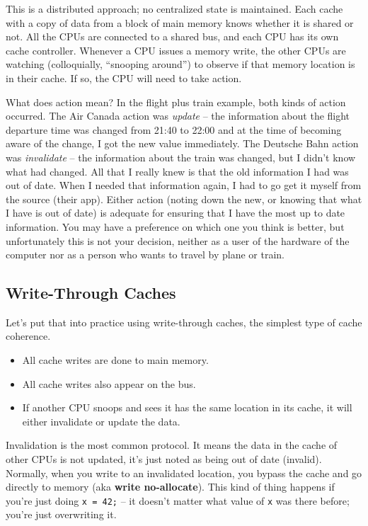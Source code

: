\documentclass[a4paper]{report}
\begin{document}
This is a distributed approach; no centralized state is maintained. Each cache with a copy of data from a block of main memory knows whether it is shared or not. All the CPUs are connected to a shared bus, and each CPU has its own cache controller. Whenever a CPU issues a memory write, the other CPUs are watching (colloquially, ``snooping around'') to observe if that memory location is in their cache. If so, the CPU will need to take action.

What does action mean? In the flight plus train example, both kinds of action occurred. The Air Canada action was \textit{update} -- the information about the flight departure time was changed from 21:40 to 22:00 and at the time of becoming aware of the change, I got the new value immediately. The Deutsche Bahn action was \textit{invalidate} -- the information about the train was changed, but I didn't know what had changed. All that I really knew is that the old information I had was out of date. When I needed that information again, I had to go get it myself from the source (their app). Either action (noting down the new, or knowing that what I have is out of date) is adequate for ensuring that I have the most up to date information. You may have a preference on which one you think is better, but unfortunately this is not your decision, neither as a user of the hardware of the computer nor as  a person who wants to travel by plane or train.

\subsection*{Write-Through Caches}
Let's put that into practice using write-through caches, the simplest type of
cache coherence.
  \begin{itemize}
    \item All cache writes are done to main memory.
    \item All cache writes also appear on the bus.
    \item If another CPU snoops and sees it has the same location in
      its cache, it will either invalidate or update the
      data.
  \end{itemize}
  
Invalidation is the most common protocol. It means the data in the cache of other CPUs is not updated, it's just noted as being out of date (invalid).  Normally, when you write to an invalidated location, you bypass the cache and go directly to memory (aka {\bf write no-allocate}). This kind of thing happens if you're just doing \texttt{x = 42;} -- it doesn't matter what value of \texttt{x} was there before; you're just overwriting it.
\end{document}
